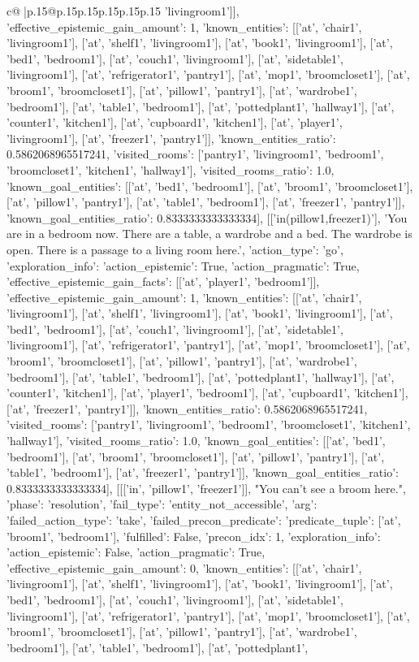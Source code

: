 \documentclass{article}
\begin{document}
{\begin{supertabular}{c@{$\;$}|p{.15\linewidth}@{}p{.15\linewidth}p{.15\linewidth}p{.15\linewidth}p{.15\linewidth}p{.15\linewidth}}
{{{'livingroom1']], 'effective_epistemic_gain_amount': 1, 'known_entities': [['at', 'chair1', 'livingroom1'], ['at', 'shelf1', 'livingroom1'], ['at', 'book1', 'livingroom1'], ['at', 'bed1', 'bedroom1'], ['at', 'couch1', 'livingroom1'], ['at', 'sidetable1', 'livingroom1'], ['at', 'refrigerator1', 'pantry1'], ['at', 'mop1', 'broomcloset1'], ['at', 'broom1', 'broomcloset1'], ['at', 'pillow1', 'pantry1'], ['at', 'wardrobe1', 'bedroom1'], ['at', 'table1', 'bedroom1'], ['at', 'pottedplant1', 'hallway1'], ['at', 'counter1', 'kitchen1'], ['at', 'cupboard1', 'kitchen1'], ['at', 'player1', 'livingroom1'], ['at', 'freezer1', 'pantry1']], 'known_entities_ratio': 0.5862068965517241, 'visited_rooms': ['pantry1', 'livingroom1', 'bedroom1', 'broomcloset1', 'kitchen1', 'hallway1'], 'visited_rooms_ratio': 1.0, 'known_goal_entities': [['at', 'bed1', 'bedroom1'], ['at', 'broom1', 'broomcloset1'], ['at', 'pillow1', 'pantry1'], ['at', 'table1', 'bedroom1'], ['at', 'freezer1', 'pantry1']], 'known_goal_entities_ratio': 0.8333333333333334}}], [['in(pillow1,freezer1)'], 'You are in a bedroom now. There are a table, a wardrobe and a bed. The wardrobe is open. There is a passage to a living room here.', {'action_type': 'go', 'exploration_info': {'action_epistemic': True, 'action_pragmatic': True, 'effective_epistemic_gain_facts': [['at', 'player1', 'bedroom1']], 'effective_epistemic_gain_amount': 1, 'known_entities': [['at', 'chair1', 'livingroom1'], ['at', 'shelf1', 'livingroom1'], ['at', 'book1', 'livingroom1'], ['at', 'bed1', 'bedroom1'], ['at', 'couch1', 'livingroom1'], ['at', 'sidetable1', 'livingroom1'], ['at', 'refrigerator1', 'pantry1'], ['at', 'mop1', 'broomcloset1'], ['at', 'broom1', 'broomcloset1'], ['at', 'pillow1', 'pantry1'], ['at', 'wardrobe1', 'bedroom1'], ['at', 'table1', 'bedroom1'], ['at', 'pottedplant1', 'hallway1'], ['at', 'counter1', 'kitchen1'], ['at', 'player1', 'bedroom1'], ['at', 'cupboard1', 'kitchen1'], ['at', 'freezer1', 'pantry1']], 'known_entities_ratio': 0.5862068965517241, 'visited_rooms': ['pantry1', 'livingroom1', 'bedroom1', 'broomcloset1', 'kitchen1', 'hallway1'], 'visited_rooms_ratio': 1.0, 'known_goal_entities': [['at', 'bed1', 'bedroom1'], ['at', 'broom1', 'broomcloset1'], ['at', 'pillow1', 'pantry1'], ['at', 'table1', 'bedroom1'], ['at', 'freezer1', 'pantry1']], 'known_goal_entities_ratio': 0.8333333333333334}}], [[['in', 'pillow1', 'freezer1']], "You can't see a broom here.", {'phase': 'resolution', 'fail_type': 'entity_not_accessible', 'arg': {'failed_action_type': 'take', 'failed_precon_predicate': {'predicate_tuple': ['at', 'broom1', 'bedroom1'], 'fulfilled': False, 'precon_idx': 1}}, 'exploration_info': {'action_epistemic': False, 'action_pragmatic': True, 'effective_epistemic_gain_amount': 0, 'known_entities': [['at', 'chair1', 'livingroom1'], ['at', 'shelf1', 'livingroom1'], ['at', 'book1', 'livingroom1'], ['at', 'bed1', 'bedroom1'], ['at', 'couch1', 'livingroom1'], ['at', 'sidetable1', 'livingroom1'], ['at', 'refrigerator1', 'pantry1'], ['at', 'mop1', 'broomcloset1'], ['at', 'broom1', 'broomcloset1'], ['at', 'pillow1', 'pantry1'], ['at', 'wardrobe1', 'bedroom1'], ['at', 'table1', 'bedroom1'], ['at', 'pottedplant1', }}}
\end{supertabular}}
\end{document}
